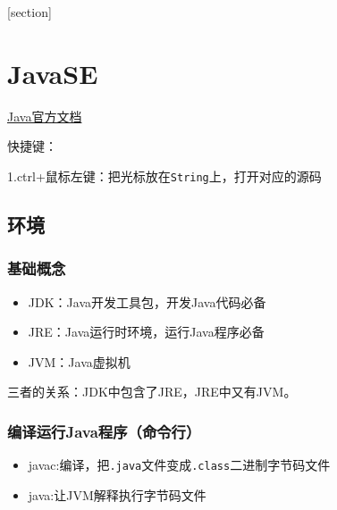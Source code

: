 \documentclass[a4paper]{report}
\begin{document}
\flushbottom%
\newcommand{\dm}[1]{\colorbox{wgray}{\lstinline`#1`}}
\newcommand{\myroman}[1]{\uppercase\expandafter{\romannumeral#1}}
[section] \renewcommand{\thenum}{\arabic{num}.} \newcommand{\num}{\refstepcounter{num}\text{\thenum}}

\newenvironment{tips}{\kaishu\zihao{-6}\color{blue}{\noindent\rule[-3pt]{\textwidth}{0.5pt}\par \em \noindent {\zihao{-5} \textcolor[rgb]{1.00,0.00,0.00}{Tips}}}\par}{\\ \rule[3mm]{\textwidth}{0.5pt}\par}

\newenvironment{zhengming}{\kaishu\zihao{-5}\color{blue}{\noindent\em 证明：}\par}{\hfill $\diamondsuit$\par}

\tableofcontents
{}%
\clearpage
{}%
\chapter{JavaSE}
\href{https://docs.oracle.com/javase/8/docs/api/index.html}{Java官方文档}

快捷键：

1.ctrl+鼠标左键：把光标放在\dm{String}上，打开对应的源码
\section{环境}
\subsection{基础概念}
\begin{itemize}
\itemsep=0pt \parskip =0pt
  \item JDK：Java开发工具包，开发Java代码必备
  \item JRE：Java运行时环境，运行Java程序必备
  \item JVM：Java虚拟机
\end{itemize}
三者的关系：JDK中包含了JRE，JRE中又有JVM。
\subsection[编译Java程序]{编译运行Java程序（命令行）}
\begin{itemize}
\itemsep=0pt \parskip =0pt
  \item javac:编译，把\dm{.java}文件变成\dm{.class}二进制字节码文件
  \item java:让JVM解释执行字节码文件
\end{itemize}
\end{document}
